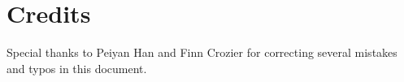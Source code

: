 \section{Credits}

Special thanks to Peiyan Han and Finn Crozier for correcting several mistakes and typos in this document.